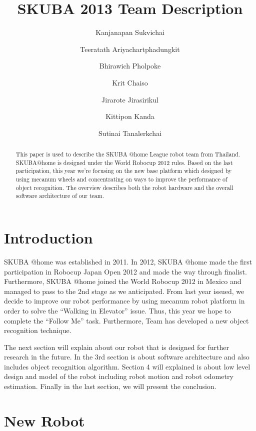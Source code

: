 \documentclass{llncs}
\newcommand{\dq}[1]{``#1''}
\begin{document}
\title{SKUBA 2013 Team Description}
\author{Kanjanapan Sukvichai
\and Teeratath Ariyachartphadungkit
\and Bhirawich Pholpoke
\and Krit Chaiso
\and Jirarote Jirasirikul
\and Kittipon Kanda
\and Sutinai Tanalerkchai
}


\maketitle

\begin{abstract}
This paper is used to describe the SKUBA @home League robot team from Thailand.
SKUBA@home is designed under the World Robocup 2012 rules. 
Based on the last participation, this year we're focusing on the new base platform which designed by using mecanum wheels and concentrating on ways to improve the performance of object recognition.
The overview describes both the robot hardware and the overall software architecture of our team.
\end{abstract}

\section{Introduction}
SKUBA @home was established in 2011. In 2012, SKUBA @home made the first participation in Robocup Japan Open 2012 and made the way through finalist. Furthermore, SKUBA @home joined the World Robocup 2012 in Mexico and managed to pass to the 2nd stage as we anticipated. From last year issued, we decide to improve our robot performance by using mecanum robot platform in order to solve the \dq{Walking in Elevator} issue. Thus, this year we hope to complete the \dq{Follow Me} task. Furthermore, Team has developed a new object recognition technique.

The next section will explain about our robot that is designed for further research in the future. In the 3rd section is about software architecture and also includes object recognition algorithm. Section 4 will explained is about low level design and model of the robot including robot motion and robot odometry estimation. Finally in the last section, we will present the conclusion.

\section{New Robot}
\end{document}
